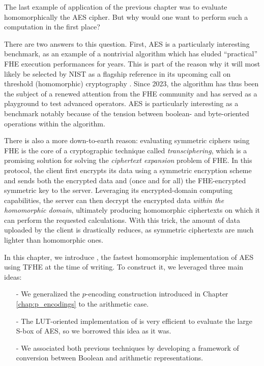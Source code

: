 The last example of application of the previous chapter was to evaluate homomorphically the \gls{AES} cipher.  But why would one want to perform such a computation in the first place?

There are two answers to this question. First,  \gls{AES} is a particularly interesting benchmark, as an example of a nontrivial algorithm which has eluded ``practical'' \gls{FHE} execution performances for years. This is part of the reason why it will most likely be selected by NIST as a flagship reference in its upcoming call on threshold (homomorphic) cryptography \cite{call_nist}. Since 2023, the algorithm has thus been the subject of a renewed attention from the \gls{FHE} community and has served as a playground to test advanced operators\cite{DBLP:conf/wahc/TramaCBS23, ISC:WWLLL23, TCHES:BonPoiRiv24, TCHES:WLWLLW24}. \gls{AES} is particularly interesting as a benchmark notably because of the tension between boolean- and byte-oriented operations within the algorithm.


There is also a more down-to-earth reason: evaluating symmetric ciphers using \gls{FHE} is the core of a cryptographic technique called \textit{transciphering}, which is a promising solution for solving the \textit{ciphertext expansion} problem of \gls{FHE}. In this protocol, the client first encrypts its data using a symmetric encryption scheme and sends both the encrypted data and (once and for all) the \gls{FHE}-encrypted symmetric key to the server. Leveraging its encrypted-domain computing capabilities, the server can then decrypt the encrypted data \emph{within the homomorphic domain}, ultimately producing homomorphic ciphertexts on which it can perform the requested calculations. With this trick, the amount of data uploaded by the client is drastically reduces, as symmetric ciphertexts are much lighter than homomorphic ones.


In this chapter, we introduce \hippo, the fastest homomorphic implementation of \gls{AES} using \gls{TFHE} at the time of writing. To construct it, we leveraged three main ideas:

\begin{itemize}
	\item[-] We generalized the $p$-encoding construction introduced in Chapter \ref{chap:p_encodings} to the arithmetic case.
	\item[-] The \gls{LUT}-oriented implementation of \cite{DBLP:conf/wahc/TramaCBS23} is very efficient to evaluate the large \gls{S-box} of \gls{AES}, so we borrowed this idea as it was.
	\item[-] We associated both previous techniques by developing a framework of conversion between Boolean and arithmetic representations.
\end{itemize}


